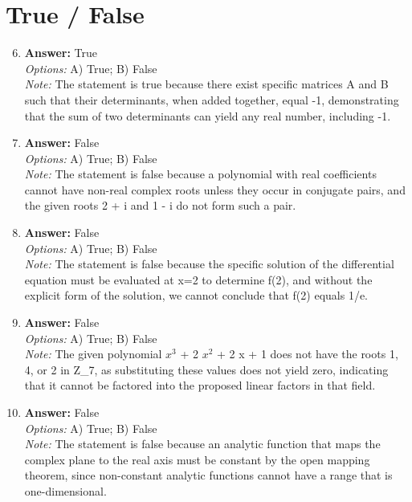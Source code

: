 \documentclass[12pt]{article}
\begin{document}
\section*{True / False}
\begin{enumerate}[label=\arabic*.]
\setcounter{enumi}{5}
\item \textbf{Answer:} True
\\ \textit{Options:} A) True; B) False
\\ \textit{Note:} The statement is true because there exist specific matrices A and B such that their determinants, when added together, equal -1, demonstrating that the sum of two determinants can yield any real number, including -1.
\item \textbf{Answer:} False
\\ \textit{Options:} A) True; B) False
\\ \textit{Note:} The statement is false because a polynomial with real coefficients cannot have non-real complex roots unless they occur in conjugate pairs, and the given roots 2 + i and 1 - i do not form such a pair.
\item \textbf{Answer:} False
\\ \textit{Options:} A) True; B) False
\\ \textit{Note:} The statement is false because the specific solution of the differential equation must be evaluated at x=2 to determine f(2), and without the explicit form of the solution, we cannot conclude that f(2) equals 1/e.
\item \textbf{Answer:} False
\\ \textit{Options:} A) True; B) False
\\ \textit{Note:} The given polynomial $x^3$ + 2 $x^2$ + 2 x + 1 does not have the roots 1, 4, or 2 in Z\_7, as substituting these values does not yield zero, indicating that it cannot be factored into the proposed linear factors in that field.
\item \textbf{Answer:} False
\\ \textit{Options:} A) True; B) False
\\ \textit{Note:} The statement is false because an analytic function that maps the complex plane to the real axis must be constant by the open mapping theorem, since non-constant analytic functions cannot have a range that is one-dimensional.
\end{enumerate}
\end{document}
